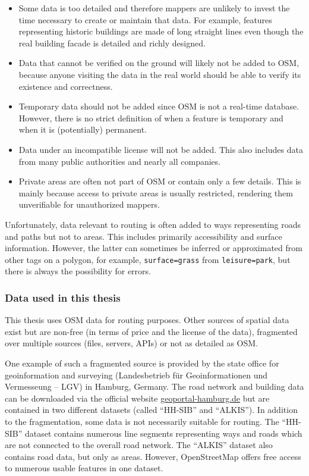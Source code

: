 			\begin{itemize}
				\item Some data is too detailed and therefore mappers are unlikely to invest the time necessary to create or maintain that data.
				For example, features representing historic buildings are made of long straight lines even though the real building facade is detailed and richly designed.
				\item Data that cannot be verified on the ground will likely not be added to OSM, because anyone visiting the data in the real world should be able to verify its existence and correctness.
				\item Temporary data should not be added since OSM is not a real-time database.
				However, there is no strict definition of when a feature is temporary and when it is (potentially) permanent.
				\item Data under an incompatible license will not be added.
				This also includes data from many public authorities and nearly all companies.
				\item Private areas are often not part of OSM or contain only a few details.
				This is mainly because access to private areas is usually restricted, rendering them unverifiable for unauthorized mappers.
			\end{itemize}
			Unfortunately, data relevant to routing is often added to ways representing roads and paths but not to areas.
			This includes primarily accessibility and surface information.
			However, the latter can sometimes be inferred or approximated from other tags on a polygon, for example, \texttt{surface=grass} from \texttt{leisure=park}, but there is always the possibility for errors.
			
		\subsubsection{Data used in this thesis}
		
			This thesis uses OSM data for routing purposes.
			Other sources of spatial data exist but are non-free (in terms of price and the license of the data), fragmented over multiple sources (files, servers, APIs) or not as detailed as OSM.
			
			One example of such a fragmented source is provided by the state office for geoinformation and surveying (Landesbetrieb für Geoinformationen und Vermesseung -- LGV) in Hamburg, Germany.
			The road network and building data can be downloaded via the official website \href{https://geoportal-hamburg.de}{geoportal-hamburg.de} but are contained in two different datasets (called \enquote{HH-SIB} and \enquote{ALKIS}).
			In addition to the fragmentation, some data is not necessarily suitable for routing.
			The \enquote{HH-SIB} dataset contains numerous line segments representing ways and roads which are not connected to the overall road network.
			The \enquote{ALKIS} dataset also contains road data, but only as areas.
			However, OpenStreetMap offers free access to numerous usable features in one dataset.
			
